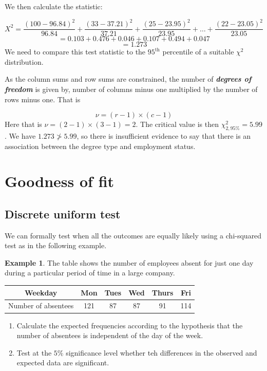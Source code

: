 \documentclass[
]{book}
\theoremstyle{definition}
\theoremstyle{definition}
\newtheorem{example}{Example}[chapter]
\theoremstyle{definition}
\theoremstyle{definition}
\theoremstyle{remark}
\begin{document}
We then calculate the statistic:

\[X^2 = \frac{(100-96.84)^2}{96.84}+\frac{(33-37.21)^2}{37.21} + \frac{(25-23.95)^2}{23.95}+\ldots+\frac{(22-23.05)^2}{23.05}\]
\[=0.103 + 0.476 + 0.046 + 0.107 + 0.494 + 0.047\]
\[=1.273\]
We need to compare this test statistic to the \(95^{\text{th}}\) percentile of a suitable \(\chi^2\) distribution.

As the column sums and row sums are constrained, the number of \textbf{\emph{degrees of freedom}} is given by, number of columns minus one multiplied by the number of rows minus one. That is

\[\nu = (r-1)\times(c-1)\]
Here that is \(\nu = (2-1)\times(3-1) = 2\). The critical value is then \(\chi^2_{2, 95\%}=5.99\).
We have \(1.273 \ngtr 5.99\), so there is insufficient evidence to say that there is an association between the degree type and employment status.

\hypertarget{goodness-of-fit}{%
\section{Goodness of fit}\label{goodness-of-fit}}

\hypertarget{discrete-uniform-test}{%
\subsection{Discrete uniform test}\label{discrete-uniform-test}}

We can formally test when all the outcomes are equally likely using a chi-squared test as in the following example.

\begin{example}

The table shows the number of employees absent for just one day during a particular period of time in a large company.

\begin{longtable}[]{@{}cccccc@{}}
\toprule
Weekday & Mon & Tues & Wed & Thurs & Fri\tabularnewline
\midrule
\endhead
Number of absentees & 121 & 87 & 87 & 91 & 114\tabularnewline
\bottomrule
\end{longtable}

\begin{enumerate}
\def\labelenumi{\alph{enumi})}
\item
  Calculate the expected frequencies according to the hypothesis that the number of absentees is independent of the day of the week.
\item
  Test at the \(5\%\) significance level whether teh differences in the observed and expected data are significant.
\end{enumerate}

\end{example}
\end{document}
